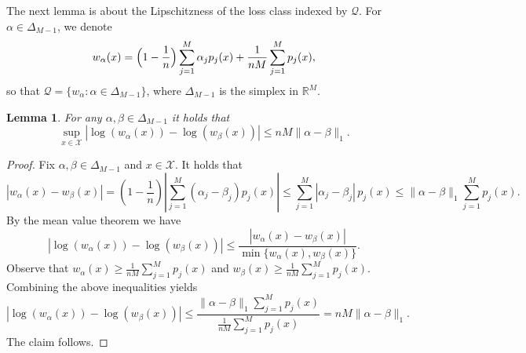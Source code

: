 \documentclass[11pt]{article}
\newcommand{\R}{\mathbb R}
\renewcommand{\le}{\leqslant}
\renewcommand{\ge}{\geqslant}
\newcommand{\M}{M}
\newcommand{\X}{\mathcal{X}}
\newcommand{\Qs}{\mathcal{Q}}
\renewcommand{\triangleq}{=}
\newtheorem{lemma}{Lemma}
\theoremstyle{definition}
\theoremstyle{remark}
\begin{document}
The next lemma is about the Lipschitzness of the loss class indexed by $\Qs$. For $\alpha \in \Delta_{\M-1}$, we denote
\[
w_\alpha(x)\triangleq \Bigl(1-\frac1n\Bigr)\sum_{j=1}^M \alpha_j p_j(x)+\frac{1}{nM}\sum_{j=1}^M p_j(x),
\]
so that $\Qs=\{w_\alpha:\alpha\in\Delta_{\M-1}\}$, where $\Delta_{\M-1}$ is the simplex in $\R^M$.

\begin{lemma}
    \label{lem:lipschitz}
    For any $\alpha, \beta \in \Delta_{\M-1}$ it holds that
    \[
    \sup\limits_{x \in \X}|\log(w_\alpha(x)) - \log(w_\beta(x))| \le nM\|\alpha - \beta\|_1.
    \]
\end{lemma}
\begin{proof}
Fix $\alpha,\beta\in\Delta_{\M-1}$ and $x\in\X$. It holds that
\[
|w_\alpha(x)-w_\beta(x)| = \left(1 - \frac{1}{n}\right)\left|\sum\limits_{j = 1}^M(\alpha_j - \beta_j)p_j(x)\right|
\le \sum_{j=1}^M |\alpha_j-\beta_j|\,p_j(x)
\le \|\alpha-\beta\|_1 \sum_{j=1}^M p_j(x).
\]
By the mean value theorem we have
\[
|\log(w_\alpha(x))-\log(w_\beta(x))|
\le \frac{|w_\alpha(x)-w_\beta(x)|}{\min\{w_\alpha(x), w_\beta(x)\}}.
\]
Observe that
$
w_\alpha(x) \ge \frac{1}{nM}\sum_{j=1}^M p_j(x)$ and 
$w_\beta(x) \ge \frac{1}{nM}\sum_{j=1}^M p_j(x)$.
Combining the above inequalities yields
\[
|\log(w_\alpha(x))-\log(w_\beta(x))|
\le
\frac{\|\alpha-\beta\|_1 \sum_{j=1}^M p_j(x)}{\frac{1}{nM}\sum_{j=1}^M p_j(x)}
= nM\|\alpha-\beta\|_1.
\]
The claim follows.
\end{proof}
\end{document}
